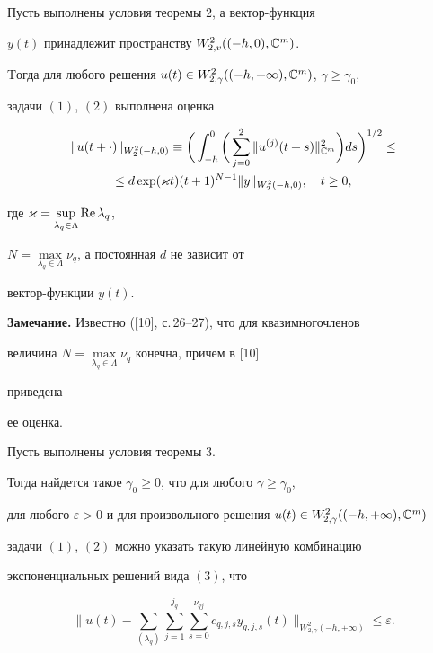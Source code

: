 \begin{thm} 


Пусть выполнены условия теоремы $2$, а вектор-функция 


$y(t)$ принадлежит пространству $W^{2}_{2,v}((-h,0),\Bbb C^m)$. 


Tогда для любого решения $u(t)\in W^{2}_{2,\gamma}((-h,+\infty),\Bbb 


C^m)$, $\gamma\ge\gamma_0$, 


задачи $(1)$, $(2)$ выполнена оценка 


\begin{multline} 


\|u(t+\cdot)\|_{W^2_2(-h,0)}\equiv\bigg(\int^0_{-h}\bigg( 


\sum^2_{j=0}\|u^{(j)}(t+s)\|^2_{\Bbb C^m}\bigg) 


d s\bigg)^{1/2} \le \\ 


% 


\le d\exp(\varkappa t)(t+1)^{N-1}\|y\|_{W^2_2(-h,0)},\quad t\ge0, 


\end{multline} 


где $\varkappa=\sup\limits_{\lambda_q\in\Lambda}\operatorname{Re}\lambda_q$, 


$N=\max\limits_{\lambda_q\in\Lambda}\nu_q$, а постоянная $d$ не зависит от 


вектор-функции $y(t)$. 


\end{thm} 


 


{\bf Замечание.} Известно ([10], с.\,26--27), что для квазимногочленов 


величина $N=\max\limits_{\lambda_q\in\Lambda}\nu_q$ конечна, причем в [10] 


приведена 


ее оценка. 


 


\begin{lem} 


Пусть выполнены условия теоремы $3$. 


Тогда найдется такое $\gamma_0\ge0$, что для любого $\gamma\ge\gamma_0$, 


для любого $\varepsilon>0$ и для произвольного решения $u(t)\in 


W^{2}_{2,\gamma}((-h,+\infty),\Bbb C^m)$ 


задачи $(1)$, $(2)$ можно указать такую линейную комбинацию 


экспоненциальных решений вида $(3)$, что 


$$ 


\bigg\|u(t)-\sum_{(\lambda_q)}\sum^{j_q}_{j=1} 


\sum^{\nu_{q j}}_{s=0}c_{q,j,s}y_{q,j,s}(t) 


\bigg\|_{W^{2}_{2,\gamma}(-h,+\infty)}\le\varepsilon. 


$$ 


\end{lem} 


